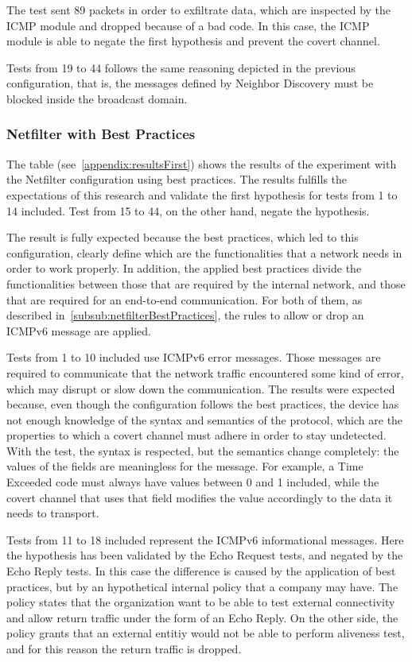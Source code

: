 \documentclass[12pt]{article}
\begin{document}
The test sent 89 packets in order to exfiltrate data, which are inspected by the ICMP module and dropped because of a bad code. In this case, the ICMP module is able to negate the first hypothesis and prevent the covert channel.

Tests from 19 to 44 follows the same reasoning depicted in the previous configuration, that is, the messages defined by Neighbor Discovery must be blocked inside the broadcast domain. 


\subsubsection{Netfilter with Best Practices}
\label{resultsFirstNetfilterBest}

The table (see~\ref{appendix:resultsFirst}) shows the results of the experiment with the Netfilter configuration using best practices. The results fulfills the expectations of this research and validate the first hypothesis for tests from 1 to 14 included. Test from 15 to 44, on the other hand, negate the hypothesis.

The result is fully expected because the best practices, which led to this configuration, clearly define which are the functionalities that a network needs in order to work properly. In addition, the applied best practices divide the functionalities between those that are required by the internal network, and those that are required for an end-to-end communication. For both of them, as described in~\ref{subsub:netfilterBestPractices}, the rules to allow or drop an ICMPv6 message are applied.

Tests from 1 to 10 included use ICMPv6 error messages. Those messages are required to communicate that the network traffic encountered some kind of error, which may disrupt or slow down the communication. The results  were expected because, even though the configuration follows the best practices, the device has not enough knowledge of the syntax and semantics of the protocol, which are the properties to which a covert channel must adhere in order to stay undetected. With the test, the syntax is respected, but the semantics change completely: the values of the fields are meaningless for the message. For example, a Time Exceeded code must always have values between 0 and 1 included, while the covert channel that uses that field modifies the value accordingly to the data it needs to transport.

Tests from 11 to 18 included represent the ICMPv6 informational messages. Here the hypothesis has been validated by the Echo Request tests, and negated by the Echo Reply tests. In this case the difference is caused by the application of best practices, but by an hypothetical internal policy that a company may have. The policy states that the organization want to be able to test external connectivity and allow return traffic under the form of an Echo Reply. On the other side, the policy grants that an external entitiy would not be able to perform aliveness test, and for this reason the return traffic is dropped.
\end{document}
